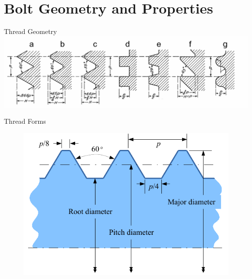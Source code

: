 \documentclass[10pt, svgnames]{beamer}
\begin{document}
\section{Bolt Geometry and Properties}
\label{sec:org3de434d}

\begin{frame}[label={sec:org8395a0a}]{Thread Geometry}
\centering
\includegraphics[width=\textwidth]{pictures/screw-thread-forms}
\end{frame}

\begin{frame}[label={sec:orgdc92b23}]{Thread Forms}
\begin{figure}[h]
  \centering
  \includegraphics[scale=1]{pictures/bolt-terminology}
\end{figure}
\end{frame}
\end{document}
